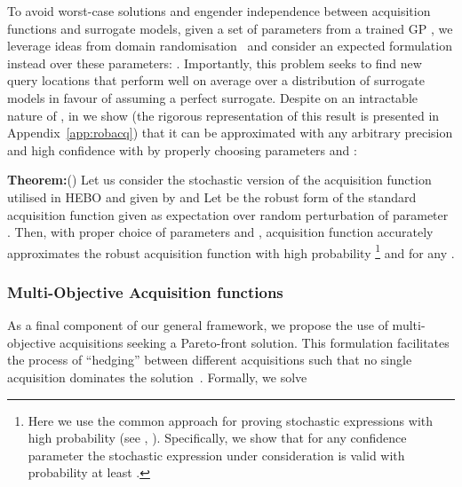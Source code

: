\documentclass[jair,twoside,11pt,theapa]{article}
\let\cite\shortcite
\theoremstyle{definition}
\newenvironment{theorem}[1]{\par\noindent\textbf{Theorem:}\space#1}{}
\begin{document}
To avoid worst-case solutions and engender independence between acquisition functions and surrogate models, given a set of parameters from a trained GP , we leverage ideas from domain randomisation~\cite{DR} and consider an expected formulation instead over these parameters: . 
Importantly, this problem seeks to find new query locations that perform well on average over a distribution of surrogate models in favour of assuming a perfect surrogate. Despite on an intractable nature of  , in  we show (the rigorous representation of this result is presented in Appendix~\ref{app:robacq}) that it can be approximated with any arbitrary precision and high confidence with  by properly choosing  parameters  and :
\begin{theorem}()
Let us consider the  stochastic version of the acquisition function utilised in HEBO and given by  and Let  be the robust form of the standard acquisition function given as expectation over random perturbation of parameter . Then,  with proper choice of parameters  and  ,  acquisition function  accurately approximates the robust acquisition function  with high probability \footnote{Here we use the common approach for proving stochastic expressions with high probability (see \cite{jordan_cubic}, \cite{AZ01}). Specifically, we show that for any confidence parameter    the stochastic expression under consideration is valid with probability at least .} and for any . 
\end{theorem}






























\subsubsection{Multi-Objective Acquisition functions}

As a final component of our general framework, we propose the use of multi-objective acquisitions seeking a Pareto-front solution. This formulation facilitates the process of ``hedging'' between different acquisitions such that no single acquisition dominates the solution~\cite{lyu2018batch}. Formally, we solve
\end{document}
